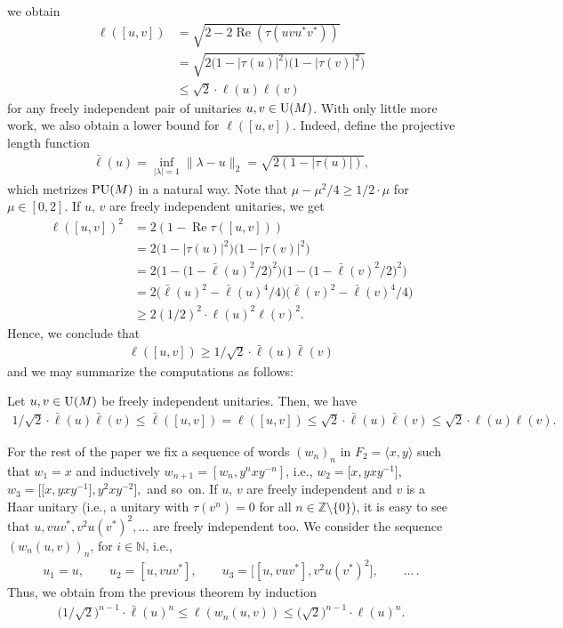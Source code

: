 we obtain
\begin{align*}
\ell([u,v]) &= \sqrt{2-2 \operatorname{Re}(\tau(uvu^*v^*))} \\
&= \sqrt{2\big(1-|\tau(u)|^2\big)\big(1- |\tau(v)|^2\big)} \\
&\leq\sqrt{2} \cdot \ell(u) \ell(v)
\end{align*}
for any freely independent pair of unitaries $u,v \in {\rm U}(M)$. With only little more work, we also obtain a lower bound for $\ell([u,v])$.
Indeed, define the projective length function
\begin{gather*}
\bar \ell(u) = \inf_{|\lambda|=1 } \|\lambda - u\|_2 = \sqrt{2(1-|\tau(u)|)},
\end{gather*}
which metrizes ${\rm PU}(M)$ in a natural way. Note that
$\mu - \mu^2/4 \geq 1/2 \cdot \mu$ for $\mu \in [0,2]$. If $u$, $v$ are freely independent unitaries, we get
\begin{align*}
\ell([u,v])^2 &= 2(1 - \operatorname{Re} \tau([u,v])) \\
&= 2 \big(1-|\tau(u)|^2\big)\big(1- |\tau(v)|^2\big) \\
&= 2 \big(1-\big(1-\bar\ell(u)^2/2\big)^2\big) \big(1-\big(1-\bar\ell(v)^2/2\big)^2\big) \\
&= 2 \big( \bar \ell(u)^2 - \bar \ell(u)^4/4\big) \big( \bar \ell(v)^2 - \bar \ell(v)^4/4\big) \\
&\geq 2 (1/2)^2 \cdot \ell(u)^2 \ell(v)^2.
\end{align*}
Hence, we conclude that
\begin{gather*}
\ell([u,v]) \geq 1/\sqrt{2} \cdot \bar \ell(u) \bar \ell(v)
\end{gather*}
and we may summarize the computations as follows:
\begin{Theorem}
Let $u,v \in {\rm U}(M)$ be freely independent unitaries. Then, we have
\begin{gather*}
1/\sqrt{2} \cdot \bar \ell(u) \bar \ell(v) \leq \bar\ell([u,v])= \ell([u,v]) \leq \sqrt{2} \cdot \bar \ell(u) \bar \ell(v) \leq \sqrt{2} \cdot \ell(u) \ell(v).
\end{gather*}
\end{Theorem}

For the rest of the paper we fix a sequence of words $(w_n)_n$ in $F_2= \langle x,y \rangle$ such that $w_1=x$ and inductively $w_{n+1} = [w_n,y^{n}xy^{-n}]$, i.e., $w_2=\big[x,yxy^{-1}\big]$, $w_3=\big[\big[x,yxy^{-1}\big],y^2xy^{-2}\big],$ and so~on. If $u$, $v$ are freely independent and $v$ is a Haar unitary (i.e., a unitary with $\tau(v^n)=0$ for all $n \in \mathbb Z \setminus \{0\}$), it is easy to see that $ u,vuv^*,v^2u(v^*)^2,\dots$ are freely independent too. We consider the sequence $(w_n(u,v))_n$, for $i \in \mathbb N$, i.e.,
\begin{gather*}
u_1=u, \qquad
u_2=[u,vuv^*], \qquad
u_3=\big[[u,vuv^*],v^2u(v^*)^2 \big],\qquad \dots\,.
\end{gather*}
Thus, we obtain from the previous theorem by induction
\begin{gather*}
\big(1/\sqrt{2}\big)^{n-1} \cdot \bar\ell(u)^n \leq \ell(w_n(u,v)) \leq \big(\sqrt{2}\big)^{n-1} \cdot \ell(u)^n.
\end{gather*}

